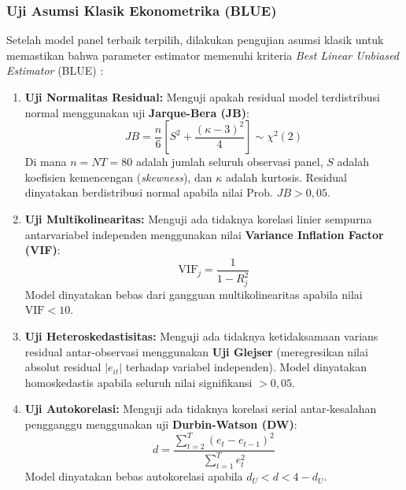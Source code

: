 \documentclass[12pt,a4paper]{article}
\numberwithin{equation}{section}
\begin{document}
\subsubsection{Uji Asumsi Klasik Ekonometrika (BLUE)}
\noindent
Setelah model panel terbaik terpilih, dilakukan pengujian asumsi klasik untuk memastikan bahwa parameter estimator memenuhi kriteria \emph{Best Linear Unbiased Estimator} (BLUE) \citep{GujaratiPorter2020}:
\begin{enumerate}
  \item \textbf{Uji Normalitas Residual:} Menguji apakah residual model terdistribusi normal menggunakan uji \textbf{Jarque-Bera (JB)}:
    \begin{equation}
      JB = \frac{n}{6} \left[ S^2 + \frac{(\kappa - 3)^2}{4} \right] \sim \chi^2(2)
    \end{equation}
    Di mana $n = NT = 80$ adalah jumlah seluruh observasi panel, $S$ adalah koefisien kemencengan (\emph{skewness}), dan $\kappa$ adalah kurtosis. Residual dinyatakan berdistribusi normal apabila nilai $\text{Prob. } JB > 0{,}05$.
  \item \textbf{Uji Multikolinearitas:} Menguji ada tidaknya korelasi linier sempurna antarvariabel independen menggunakan nilai \textbf{Variance Inflation Factor (VIF)}:
    \begin{equation}
      \text{VIF}_j = \frac{1}{1 - R_j^2}
    \end{equation}
    Model dinyatakan bebas dari gangguan multikolinearitas apabila nilai $\text{VIF} < 10$.
  \item \textbf{Uji Heteroskedastisitas:} Menguji ada tidaknya ketidaksamaan varians residual antar-observasi menggunakan \textbf{Uji Glejser} (meregresikan nilai absolut residual $|e_{it}|$ terhadap variabel independen). Model dinyatakan homoskedastis apabila seluruh nilai signifikansi $> 0{,}05$.
  \item \textbf{Uji Autokorelasi:} Menguji ada tidaknya korelasi serial antar-kesalahan pengganggu menggunakan uji \textbf{Durbin-Watson (DW)}:
    \begin{equation}
      d = \frac{\sum_{t=2}^T (e_t - e_{t-1})^2}{\sum_{t=1}^T e_t^2}
    \end{equation}
    Model dinyatakan bebas autokorelasi apabila $d_U < d < 4 - d_U$.
\end{enumerate}
\end{document}
